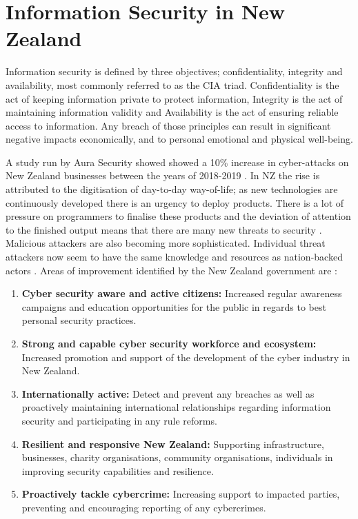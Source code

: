 \section{Information Security in New Zealand}

Information security is defined by three objectives; confidentiality, integrity and availability, most commonly referred to as the CIA triad. Confidentiality is the act of keeping information private to protect information, Integrity is the act of maintaining information validity and Availability is the act of ensuring reliable access to information.  Any breach of those principles can result in significant negative impacts economically, and to personal emotional and physical well-being. 
\newline
\par A study run by Aura Security showed showed a 10\% increase in cyber-attacks on New Zealand businesses between the years of 2018-2019 \cite{aura}. In NZ the rise is attributed to the digitisation of day-to-day way-of-life; as new technologies are continuously developed there is an urgency to deploy products. There is a lot of pressure on programmers to finalise these products and the deviation of attention to the finished output means that there are many new threats to security \cite{securitystrat}. Malicious attackers are also becoming more sophisticated. Individual threat attackers now seem to have the same knowledge and resources as nation-backed actors \cite{securitystrat}.
\newline
\newline
Areas of improvement identified by the New Zealand government are \cite{securitystrat}:

\begin{enumerate}
    \item \textbf{Cyber security aware and active citizens:} Increased regular awareness campaigns and education opportunities for the public in regards to best personal security practices. 
    \item \textbf{Strong and capable cyber security workforce and ecosystem:} Increased promotion and support of the development of the cyber industry in New Zealand.
    \item \textbf{Internationally active:} Detect and prevent any breaches as well as proactively maintaining international relationships regarding information security and participating in any rule reforms. 
    \item \textbf{Resilient and responsive New Zealand:} Supporting infrastructure, businesses, charity organisations, community organisations, individuals in improving security capabilities and resilience.
    \item \textbf{Proactively tackle cybercrime:} Increasing support to impacted parties,  preventing and encouraging reporting of any cybercrimes. 
\end{enumerate}

